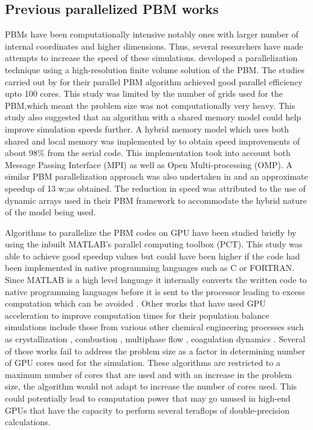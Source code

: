 \documentclass[preprint,10pt,authoryear,review]{elsarticle}
\begin{document}
\subsection{Previous parallelized PBM works}
PBMs have been computationally intensive notably ones with larger number of internal 
coordinates and higher dimensions. Thus, several researchers have made attempts to increase 
the speed of these simulations. \cite{Gunawan2008} developed a parallelization technique 
using a high-resolution finite volume solution of the PBM. The studies carried out by 
\cite{Gunawan2008} for their parallel PBM algorithm achieved good parallel efficiency upto 
100 cores. This study was limited by the number of grids used for the PBM,which meant the 
problem size was not computationally very heavy. This study also suggested that an algorithm 
with a shared memory model could help improve simulation speeds further. A hybrid memory model 
which uses both shared and local memory was implemented by \cite{Bettencourt2017} to 
obtain speed improvements of about 98\% from the serial code. This implementation took 
into account both Message Passing Interface (MPI) as well as Open Multi-processing (OMP). 
A similar PBM parallelization approach was also undertaken in \cite{Sampat2018} and an 
approximate speedup of 13 w;as obtained. The reduction in speed was attributed to the use of 
dynamic arrays used in their PBM framework to accommodate the hybrid nature of the model 
being used. 

Algorithms to parallelize the PBM codes on GPU have been studied briefly by \cite{Prakash2013b} 
using the inbuilt MATLAB's parallel computing toolbox (PCT). This study was able to achieve 
good speedup values but could have been higher if the code had been implemented in native 
programming languages such as C or FORTRAN. Since MATLAB is a high level language it internally 
converts the written code to native programming languages before it is sent to the processor 
leading to excess computation which can be avoided \citep{pctMatlab}. Other works that have 
used GPU acceleration to improve computation times for their population balance simulations 
include those from various other chemical engineering processes such as crystallization 
\citep{Szilagy2016}, combustion \citep{Shi2012} , multiphase flow \citep{santos2013}, 
coagulation dynamics \citep{Xu2015}. Several of these works fail to address the problem 
size as a factor in determining number of GPU cores used for the simulation. These algorithms 
are restricted to a maximum number of cores that are used and with an increase in the 
problem size, the algorithm would not adapt to increase the number of cores used. 
This could potentially lead to computation power that may go unused in high-end GPUs that 
have the capacity to perform several teraflops of double-precision calculations.
\end{document}
